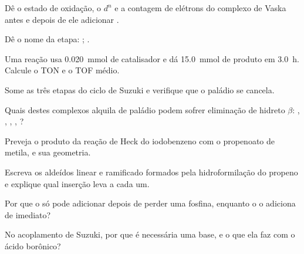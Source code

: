 \begin{exercise}[$\star$]\label{exo:b2:catalytic-cycles:1}
Dê o estado de oxidação, o $d^n$ e a contagem de elétrons do complexo de Vaska
 antes e depois de ele adicionar .
\end{exercise}

\begin{exercise}[$\star$]\label{exo:b2:catalytic-cycles:2}
Dê o nome da etapa: ; .
\end{exercise}

\begin{exercise}[$\star$]\label{exo:b2:catalytic-cycles:3}
Uma reação usa \qty{0.020}{mmol} de catalisador e dá \qty{15.0}{mmol} de produto em
\qty{3.0}{h}. Calcule o TON e o TOF médio.
\end{exercise}

\begin{exercise}[$\star$]\label{exo:b2:catalytic-cycles:4}
Some as três etapas do ciclo de Suzuki e verifique que o paládio se cancela.
\end{exercise}

\begin{exercise}[$\star\star$]\label{exo:b2:catalytic-cycles:5}
Quais destes complexos alquila de paládio podem sofrer eliminação de hidreto $\beta$:
, , , , ?
\end{exercise}

\begin{exercise}[$\star\star$]\label{exo:b2:catalytic-cycles:6}
Preveja o produto da reação de Heck do iodobenzeno com o propenoato de metila,
e sua geometria.
\end{exercise}

\begin{exercise}[$\star\star$]\label{exo:b2:catalytic-cycles:7}
Escreva os aldeídos linear e ramificado formados pela hidroformilação do
propeno e explique qual inserção leva a cada um.
\end{exercise}

\begin{exercise}[$\star\star$]\label{exo:b2:catalytic-cycles:8}
Por que o  só pode adicionar  depois de perder uma
fosfina, enquanto o  o adiciona de imediato?
\end{exercise}

\begin{exercise}[$\star\star$]\label{exo:b2:catalytic-cycles:9}
No acoplamento de Suzuki, por que é necessária uma base, e o que ela faz com o ácido borônico?
\end{exercise}

